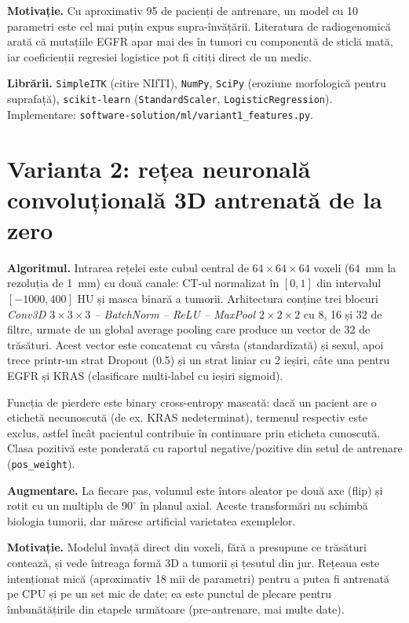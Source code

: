 \documentclass[runningheads,a4paper,11pt]{report}
\begin{document}
\textbf{Motivație.} Cu aproximativ 95 de pacienți de antrenare, un model cu 10 parametri este cel mai puțin expus supra-învățării. Literatura de radiogenomică arată că mutațiile EGFR apar mai des în tumori cu componentă de sticlă mată, iar coeficienții regresiei logistice pot fi citiți direct de un medic.

\textbf{Librării.} \texttt{SimpleITK} (citire NIfTI), \texttt{NumPy}, \texttt{SciPy} (eroziune morfologică pentru suprafață), \texttt{scikit-learn} (\texttt{StandardScaler}, \texttt{LogisticRegression}). Implementare: \nolinkurl{software-solution/ml/variant1_features.py}.

\section{Varianta 2: rețea neuronală convoluțională 3D antrenată de la zero}
\textbf{Algoritmul.} Intrarea rețelei este cubul central de $64 \times 64 \times 64$ voxeli (64~mm la rezoluția de 1~mm) cu două canale: CT-ul normalizat în $[0,1]$ din intervalul $[-1000, 400]$ HU și masca binară a tumorii. Arhitectura conține trei blocuri \textit{Conv3D $3\times3\times3$ -- BatchNorm -- ReLU -- MaxPool $2\times2\times2$} cu 8, 16 și 32 de filtre, urmate de un global average pooling care produce un vector de 32 de trăsături. Acest vector este concatenat cu vârsta (standardizată) și sexul, apoi trece printr-un strat Dropout (0.5) și un strat liniar cu 2 ieșiri, câte una pentru EGFR și KRAS (clasificare multi-label cu ieșiri sigmoid).

Funcția de pierdere este binary cross-entropy mascată: dacă un pacient are o etichetă necunoscută (de ex. KRAS nedeterminat), termenul respectiv este exclus, astfel încât pacientul contribuie în continuare prin eticheta cunoscută. Clasa pozitivă este ponderată cu raportul negative/pozitive din setul de antrenare (\texttt{pos\_weight}).

\textbf{Augmentare.} La fiecare pas, volumul este întors aleator pe două axe (flip) și rotit cu un multiplu de $90^\circ$ în planul axial. Aceste transformări nu schimbă biologia tumorii, dar măresc artificial varietatea exemplelor.

\textbf{Motivație.} Modelul învață direct din voxeli, fără a presupune ce trăsături contează, și vede întreaga formă 3D a tumorii și țesutul din jur. Rețeaua este intenționat mică (aproximativ 18 mii de parametri) pentru a putea fi antrenată pe CPU și pe un set mic de date; ea este punctul de plecare pentru îmbunătățirile din etapele următoare (pre-antrenare, mai multe date).
\end{document}
